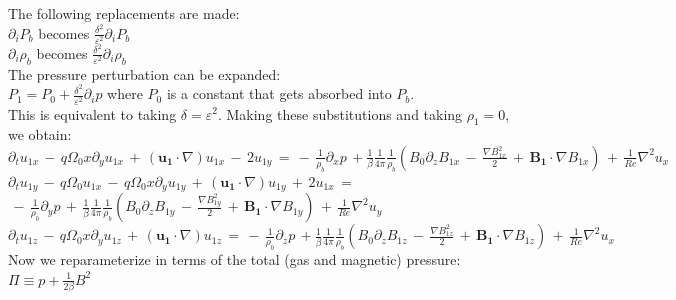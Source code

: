 \documentclass[letterpaper,12pt]{article}
\newcommand\reye{\mathrel{Re}}
\begin{document}
The following replacements are made: \\

\noindent $\partial_i P_b$ becomes $\frac{\delta^2}{\varepsilon^2} \partial_i P_b $ \\
$\partial_i \rho_b$ becomes $\frac{\delta^2}{\varepsilon^2} \partial_i \rho_b $ \\

The pressure perturbation can be expanded: \\

$P_1 = P_0 + \frac{\delta^2}{\varepsilon^2}\partial_i p$ where $P_0$ is a constant that gets absorbed into $P_b$. \\

This is equivalent to taking $\delta = \varepsilon^2$. Making these substitutions and taking $\rho_1 = 0$, we obtain: \\

$\partial_t u_{1x} \, - \, q \Omega_0 x \partial_y u_{1x} \,+ \, \left(\mathbf{u_1} \cdot \nabla\right)u_{1x} \, - \, 2 u_{1y}\,= \, - \, \frac{1}{\rho_b}\partial_x p  \, + \frac{1}{\beta} \frac{1}{4\pi} \frac{1}{\rho_b} \left( B_0 \partial_z B_{1x} \,- \, \frac{\nabla B_{1x}^2}{2} \, + \, \mathbf{B_1}\cdot \nabla B_{1x} \right) \, + \, \frac{1}{\reye}\nabla^2 u_x  $ \\

$\partial_t u_{1y}\, - \, q \Omega_0 u_{1x}  \, - \, q \Omega_0 x \partial_y u_{1y} \,+ \, \left(\mathbf{u_1} \cdot \nabla\right)u_{1y} \,+ \, 2u_{1x} \, =  $\\
$\, - \, \frac{1}{\rho_b}\partial_y p \, + \,  \frac{1}{\beta} \frac{1}{4\pi} \frac{1}{\rho_b} \left( B_0 \partial_z B_{1y} \,- \, \frac{\nabla B_{1y}^2}{2} \, + \, \mathbf{B_1}\cdot \nabla B_{1y} \right) \, + \, \frac{1}{\reye}\nabla^2 u_y  $ \\

$\partial_t u_{1z} \, - \, q \Omega_0 x \partial_y u_{1z} \,+ \, \left(\mathbf{u_1} \cdot \nabla\right)u_{1z} \, = \, - \, \frac{1}{\rho_b}\partial_z p  \, + \frac{1}{\beta} \frac{1}{4\pi} \frac{1}{\rho_b} \left( B_0 \partial_z B_{1z} \,- \, \frac{\nabla B_{1z}^2}{2} \, + \, \mathbf{B_1}\cdot \nabla B_{1z} \right) \, + \, \frac{1}{\reye}\nabla^2 u_x  $ \\

Now we reparameterize in terms of the total (gas and magnetic) pressure: \\

$\Pi \equiv p + \frac{1}{2\beta} B^2$ \\
\end{document}
